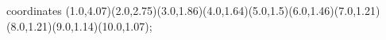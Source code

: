 					coordinates { (1.0,4.07)(2.0,2.75)(3.0,1.86)(4.0,1.64)(5.0,1.5)(6.0,1.46)(7.0,1.21)(8.0,1.21)(9.0,1.14)(10.0,1.07)};